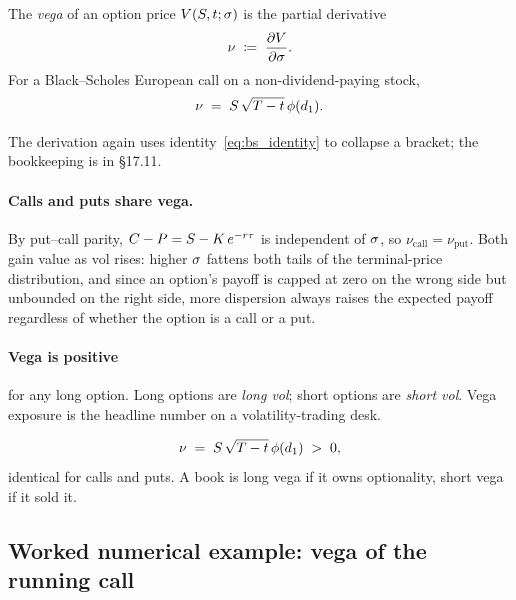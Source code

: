 \begin{definition}[Vega]
The \emph{vega} of an option price $V(S, t; \sigma)$ is the partial
derivative
\begin{equation}
  \nu \;\coloneqq\; \frac{\partial V}{\partial \sigma}.
  \label{eq:vega_def}
\end{equation}
For a Black--Scholes European call on a non-dividend-paying stock,
\begin{equation}
  \nu \;=\; S\,\sqrt{T - t}\,\phi(d_1).
  \label{eq:vega_call}
\end{equation}
\end{definition}

The derivation again uses identity~\eqref{eq:bs_identity} to
collapse a bracket; the bookkeeping is in \citeHull \S17.11.

\paragraph{Calls and puts share vega.} By put--call parity,
$C - P = S - K\,e^{-r \tau}$ is independent of
$\sigma$, so $\nu_{\text{call}} = \nu_{\text{put}}$. Both gain
value as vol rises: higher $\sigma$ fattens both tails of the
terminal-price distribution, and since an option's payoff is
capped at zero on the wrong side but unbounded on the right side,
more dispersion always raises the expected payoff regardless of
whether the option is a call or a put.

\paragraph{Vega is positive} for any long option. Long options are
\emph{long vol}; short options are \emph{short vol}. Vega exposure
is the headline number on a volatility-trading desk.

\begin{keyfactbox}
\begin{equation*}
  \nu \;=\; S\,\sqrt{T - t}\,\phi(d_1) \;>\; 0,
\end{equation*}
identical for calls and puts. A book is long vega if it owns
optionality, short vega if it sold it.
\end{keyfactbox}

\subsection{Worked numerical example: vega of the running call}
\label{subsec:ch16_vega_numex}

